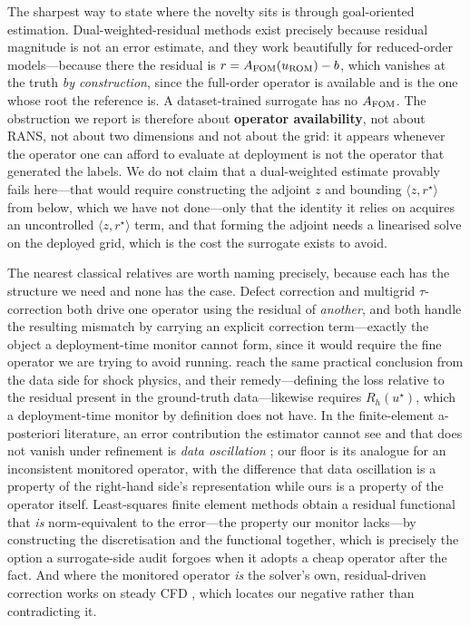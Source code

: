 The sharpest way to state where the novelty sits is through goal-oriented estimation.
Dual-weighted-residual methods \citep{beckerrannacher2001dwr} exist precisely because
residual magnitude is not an error estimate, and they work beautifully for reduced-order
models---because there the residual is $r=A_{\rm FOM}(u_{\rm ROM})-b$, which vanishes at
the truth \emph{by construction}, since the full-order operator is available and is the one
whose root the reference is. A dataset-trained surrogate has no $A_{\rm FOM}$. The
obstruction we report is therefore about \textbf{operator availability}, not about RANS,
not about two dimensions and not about the grid: it appears whenever the operator one can
afford to evaluate at deployment is not the operator that generated the labels. We do not
claim that a dual-weighted estimate provably fails here---that would require constructing
the adjoint $z$ and bounding $\langle z,r^\star\rangle$ from below, which we have not
done---only that the identity it relies on acquires an uncontrolled $\langle z,r^\star\rangle$
term, and that forming the adjoint needs a linearised solve on the deployed grid, which is
the cost the surrogate exists to avoid.

The nearest classical relatives are worth naming precisely, because each has the structure
we need and none has the case. Defect correction \citep{stetter1978defect} and multigrid
$\tau$-correction \citep{brandt2011multigrid} both drive one operator using the residual of
\emph{another}, and both handle the resulting mismatch by carrying an explicit correction
term---exactly the object a deployment-time monitor cannot form, since it would require the
fine operator we are trying to avoid running. \citet{zhang2026phymgn} reach the same
practical conclusion from the data side for shock physics, and their remedy---defining the
loss relative to the residual present in the ground-truth data---likewise requires
$R_h(u^\star)$, which a deployment-time monitor by definition does not have. In the
finite-element a-posteriori literature, an error contribution the estimator cannot see and
that does not vanish under refinement is \emph{data oscillation} \citep{morin2000data}; our
floor is its analogue for an inconsistent monitored operator, with the difference that data
oscillation is a property of the right-hand side's representation while ours is a property
of the operator itself. Least-squares finite element methods
\citep{bochevgunzburger2009book} obtain a residual functional that \emph{is}
norm-equivalent to the error---the property our monitor lacks---by constructing the
discretisation and the functional together, which is precisely the option a surrogate-side
audit forgoes when it adopts a cheap operator after the fact. And where the monitored
operator \emph{is} the solver's own, residual-driven correction works on steady CFD
\citep{lei2026newtonkrylov}, which locates our negative rather than contradicting it.


